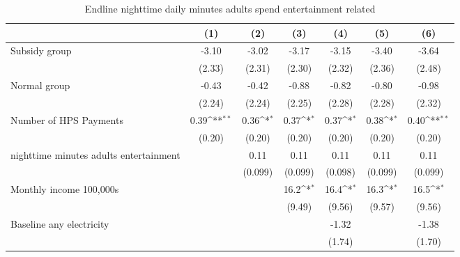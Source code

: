 \begin{table}[htbp]\centering
\def\sym#1{\ifmmode^{#1}\else\(^{#1}\)\fi}
\caption{Endline nighttime daily minutes adults spend entertainment related}
\begin{tabular*}{1\hsize}{@{\hskip\tabcolsep\extracolsep\fill}l*{6}{c}}
\toprule
                &\multicolumn{1}{c}{(1)}         &\multicolumn{1}{c}{(2)}         &\multicolumn{1}{c}{(3)}         &\multicolumn{1}{c}{(4)}         &\multicolumn{1}{c}{(5)}         &\multicolumn{1}{c}{(6)}         \\
\midrule
Subsidy group   &    -3.10         &    -3.02         &    -3.17         &    -3.15         &    -3.40         &    -3.64         \\
                &   (2.33)         &   (2.31)         &   (2.30)         &   (2.32)         &   (2.36)         &   (2.48)         \\
Normal group    &    -0.43         &    -0.42         &    -0.88         &    -0.82         &    -0.80         &    -0.98         \\
                &   (2.24)         &   (2.24)         &   (2.25)         &   (2.28)         &   (2.28)         &   (2.32)         \\
Number of HPS Payments&     0.39\sym{**} &     0.36\sym{*}  &     0.37\sym{*}  &     0.37\sym{*}  &     0.38\sym{*}  &     0.40\sym{**} \\
                &   (0.20)         &   (0.20)         &   (0.20)         &   (0.20)         &   (0.20)         &   (0.20)         \\
nighttime minutes adults entertainment&                  &     0.11         &     0.11         &     0.11         &     0.11         &     0.11         \\
                &                  &  (0.099)         &  (0.099)         &  (0.098)         &  (0.099)         &  (0.099)         \\
Monthly income 100,000s&                  &                  &     16.2\sym{*}  &     16.4\sym{*}  &     16.3\sym{*}  &     16.5\sym{*}  \\
                &                  &                  &   (9.49)         &   (9.56)         &   (9.57)         &   (9.56)         \\
Baseline any electricity&                  &                  &                  &    -1.32         &                  &    -1.38         \\
                &                  &                  &                  &   (1.74)         &                  &   (1.70)         \\

\end{tabular*}
\end{table}
